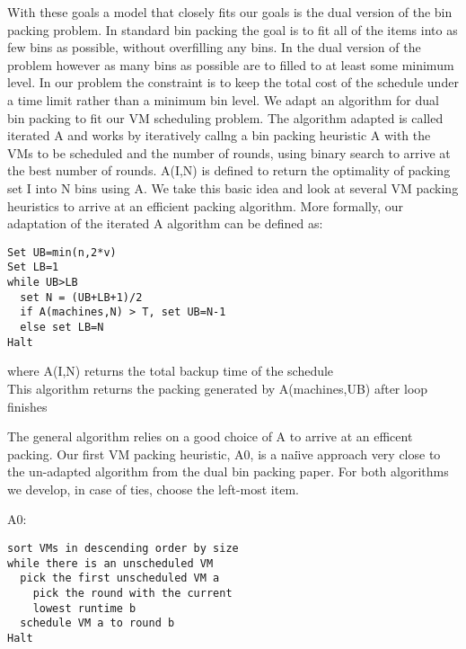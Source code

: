 With these goals a model that closely fits our goals is the dual version of the
bin packing problem. In standard bin packing the goal is to fit all of the
items into as few bins as possible, without overfilling any bins. In the dual
version of the problem however as many bins as possible are to filled to at
least some minimum level. In our problem the constraint is to keep the total
cost of the schedule under a time limit rather than a minimum bin level. We
adapt an algorithm for dual bin packing\cite{DualBinPacking} to fit our VM
scheduling problem. The algorithm adapted is called iterated A and works by
iteratively callng a bin packing heuristic A with the VMs to be scheduled and
the number of rounds, using binary search to arrive at the best number of
rounds. A(I,N) is defined to return the optimality of packing set I into N bins
using A. We take this basic idea and look at several VM packing heuristics to
arrive at an efficient packing algorithm. More formally, our adaptation of the
iterated A algorithm can be defined as:


\begin{lstlisting}
Set UB=min(n,2*v)
Set LB=1
while UB>LB
  set N = (UB+LB+1)/2
  if A(machines,N) > T, set UB=N-1
  else set LB=N
Halt
\end{lstlisting}
where A(I,N) returns the total backup time of the schedule\\
This algorithm returns the packing generated by A(machines,UB) after loop finishes

The general algorithm relies on a good choice of A to arrive at an efficent
packing. Our first VM packing heuristic, A0, is a nai\"\i{}ve approach very
close to the un-adapted algorithm from the dual bin packing paper. For both
algorithms we develop, in case of ties, choose the left-most item.

A0:
\begin{lstlisting}
sort VMs in descending order by size
while there is an unscheduled VM
  pick the first unscheduled VM a
    pick the round with the current
    lowest runtime b
  schedule VM a to round b
Halt
\end{lstlisting}

